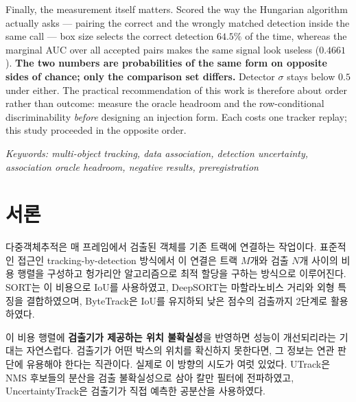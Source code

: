 \documentclass[12pt,a4paper,oneside]{report}
\begin{document}
Finally, the measurement itself matters. Scored the way the Hungarian algorithm actually asks --- pairing the correct and the wrongly matched detection inside the same call --- box size selects the correct detection $64.5\%$ of the time, whereas the marginal AUC over all accepted pairs makes the same signal look useless ($0.4661$). \textbf{The two numbers are probabilities of the same form on opposite sides of chance; only the comparison set differs.} Detector $\sigma$ stays below $0.5$ under either. The practical recommendation of this work is therefore about order rather than outcome: measure the oracle headroom and the row-conditional discriminability \textit{before} designing an injection form. Each costs one tracker replay; this study proceeded in the opposite order.

\vspace{0.3cm}
\noindent\textit{Keywords: multi-object tracking, data association, detection uncertainty, association oracle headroom, negative results, preregistration}


\tableofcontents

\chapter{서론}

다중객체추적은 매 프레임에서 검출된 객체를 기존 트랙에 연결하는 작업이다. 표준적인 접근인 tracking-by-detection 방식에서 이 연결은 트랙 $M$개와 검출 $N$개 사이의 비용 행렬을 구성하고 헝가리안 알고리즘\citep{kuhn1955}으로 최적 할당을 구하는 방식으로 이루어진다. SORT\citep{bewley2016}는 이 비용으로 IoU를 사용하였고, DeepSORT\citep{wojke2017}는 마할라노비스 거리와 외형 특징을 결합하였으며, ByteTrack\citep{zhang2022}은 IoU를 유지하되 낮은 점수의 검출까지 2단계로 활용하였다.

이 비용 행렬에 \textbf{검출기가 제공하는 위치 불확실성}을 반영하면 성능이 개선되리라는 기대는 자연스럽다. 검출기가 어떤 박스의 위치를 확신하지 못한다면, 그 정보는 연관 판단에 유용해야 한다는 직관이다. 실제로 이 방향의 시도가 여럿 있었다. UTrack\citep{solano2024}은 NMS 후보들의 분산을 검출 불확실성으로 삼아 칼만 필터에 전파하였고, UncertaintyTrack\citep{lee2024}은 검출기가 직접 예측한 공분산을 사용하였다.
\end{document}
